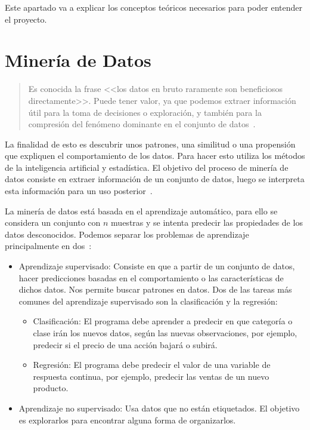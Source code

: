
Este apartado va a explicar los conceptos teóricos necesarios para poder entender el proyecto.

\section{Minería de Datos}
\begin{quote}
Es conocida la frase <<los datos en bruto raramente son beneficiosos directamente>>. Puede tener valor, ya que podemos extraer información útil para la toma de decisiones o exploración, y también para la compresión del fenómeno dominante en el conjunto de datos~\cite{mineria}.
\end{quote}

La finalidad de esto es descubrir unos patrones, una similitud o una propensión que expliquen el comportamiento de los datos. Para hacer esto utiliza los métodos de la inteligencia artificial y estadística.
El objetivo del proceso de minería de datos consiste en extraer información de un conjunto de datos, luego se interpreta esta información para un uso posterior~\cite{wiki:datamining}.

La minería de datos está basada en el aprendizaje automático, para ello se considera un conjunto con $n$ muestras y se intenta predecir las propiedades de los datos desconocidos. Podemos separar los problemas de aprendizaje principalmente en dos~\cite{scikitlearn2}:
	\begin{itemize}
		\item Aprendizaje supervisado: Consiste en que a partir de un conjunto de datos, hacer predicciones basadas en el comportamiento o las características de dichos datos. Nos permite buscar patrones en datos. Dos de las tareas más comunes del aprendizaje supervisado son la clasificación y la regresión:
		
		\begin{itemize}
		 	\item Clasificación: El programa debe aprender a predecir en que categoría o clase irán los nuevos datos, según las nuevas observaciones, por ejemplo, predecir si el precio de una acción bajará o subirá.
		 	\item Regresión: El programa debe predecir el valor de una variable de respuesta continua, por ejemplo, predecir las ventas de un nuevo producto.
		\end{itemize}
		
		\item Aprendizaje no supervisado: Usa datos que no están etiquetados. El objetivo es explorarlos para encontrar alguna forma de organizarlos.
	\end{itemize}

